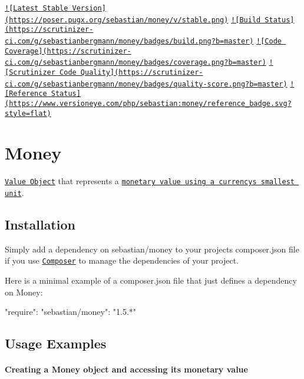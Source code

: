 \href{https://packagist.org/packages/sebastian/money}{\tt !\mbox{[}Latest Stable Version\mbox{]}(https\+://poser.\+pugx.\+org/sebastian/money/v/stable.\+png)} \href{https://scrutinizer-ci.com/g/sebastianbergmann/money/build-status/master}{\tt !\mbox{[}Build Status\mbox{]}(https\+://scrutinizer-\/ci.\+com/g/sebastianbergmann/money/badges/build.\+png?b=master)} \href{https://scrutinizer-ci.com/g/sebastianbergmann/money/?branch=master}{\tt !\mbox{[}Code Coverage\mbox{]}(https\+://scrutinizer-\/ci.\+com/g/sebastianbergmann/money/badges/coverage.\+png?b=master)} \href{https://scrutinizer-ci.com/g/sebastianbergmann/money/?branch=master}{\tt !\mbox{[}Scrutinizer Code Quality\mbox{]}(https\+://scrutinizer-\/ci.\+com/g/sebastianbergmann/money/badges/quality-\/score.\+png?b=master)} \href{https://www.versioneye.com/php/sebastian:money/references}{\tt !\mbox{[}Reference Status\mbox{]}(https\+://www.\+versioneye.\+com/php/sebastian\+:money/reference\+\_\+badge.\+svg?style=flat)}

\section*{Money}

\href{http://martinfowler.com/bliki/ValueObject.html}{\tt Value Object} that represents a \href{http://martinfowler.com/eaaCatalog/money.html}{\tt monetary value using a currency\textquotesingle{}s smallest unit}.

\subsection*{Installation}

Simply add a dependency on {\ttfamily sebastian/money} to your project\textquotesingle{}s {\ttfamily composer.\+json} file if you use \href{http://getcomposer.org/}{\tt Composer} to manage the dependencies of your project.

Here is a minimal example of a {\ttfamily composer.\+json} file that just defines a dependency on Money\+: \begin{DoxyVerb}{
    "require": {
        "sebastian/money": "1.5.*"
    }
}
\end{DoxyVerb}


\subsection*{Usage Examples}

\paragraph*{Creating a Money object and accessing its monetary value}

